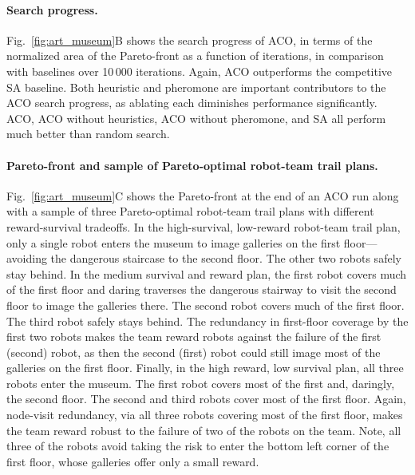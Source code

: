 \documentclass[fleqn,10pt,lineno]{wlpeerj}
\begin{document}
\paragraph{Search progress.}
Fig.~\ref{fig:art_museum}B shows the search progress of ACO, in terms of the normalized area of the Pareto-front as a function of iterations, in comparison with baselines over 10\,000 iterations. Again, ACO outperforms the competitive SA baseline. Both heuristic and pheromone are important contributors to the ACO search progress, as ablating each diminishes performance significantly. ACO, ACO without heuristics, ACO without pheromone, and SA all perform much better than random search. 

\paragraph{Pareto-front and sample of Pareto-optimal robot-team trail plans.}
Fig.~\ref{fig:art_museum}C shows the Pareto-front at the end of an ACO run along with a sample of three Pareto-optimal robot-team trail plans with different reward-survival tradeoffs. 
In the high-survival, low-reward robot-team trail plan, only a single robot enters the museum to image galleries on the first floor---avoiding the dangerous staircase to the second floor. The other two robots safely stay behind.
In the medium survival and reward plan, the first robot covers much of the first floor and daring traverses the dangerous stairway to visit the second floor to image the galleries there. The second robot covers much of the first floor. The third robot safely stays behind. The redundancy in first-floor coverage by the first two robots makes the team reward robots against the failure of the first (second) robot, as then the second (first) robot could still image most of the galleries on the first floor.
Finally, in the high reward, low survival plan, all three robots enter the museum.
The first robot covers most of the first and, daringly, the second floor. The second and third robots cover most of the first floor. 
 Again, node-visit redundancy, via all three robots covering most of the first floor, makes the team reward robust to the failure of two of the robots on the team.
Note, all three of the robots avoid taking the risk to enter the bottom left corner of the first floor, whose galleries offer only a small reward.
\end{document}
